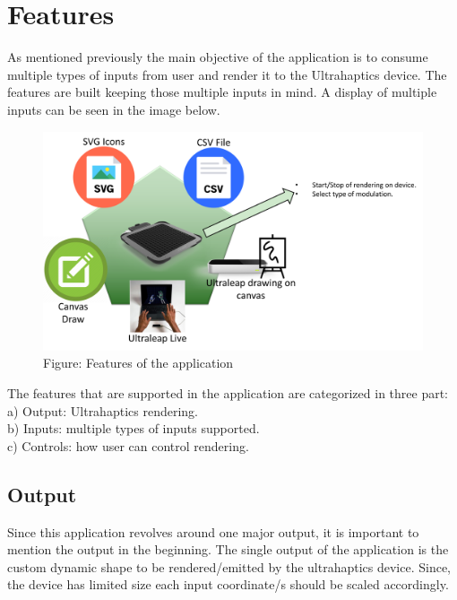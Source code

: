 %
\chapter{Features}
\label{sec:concepts}


As mentioned previously the main objective of the application is to consume multiple types of 
inputs from user and render it to the 
Ultrahaptics device. The features are built keeping those multiple inputs in mind. 
A display of multiple inputs can be seen in the image below.
\begin{figure}[htb]
	\includegraphics[width=\textwidth]{gfx/Features.png}
	\caption{Figure: Features of the application}
	\label{fig:features}
\end{figure}
The features that are supported in the application are categorized in three part: \\[2mm]
a) Output: Ultrahaptics rendering.\\
b) Inputs: multiple types of inputs supported.\\
c) Controls: how user can control rendering.\\[2mm]

\section{Output}
Since this application revolves around one major output, it is important to mention 
the output in the beginning. The single output of the application is 
the custom dynamic shape to be rendered/emitted by the ultrahaptics device. 
Since, the device has limited size each input coordinate/s should  be scaled accordingly.

